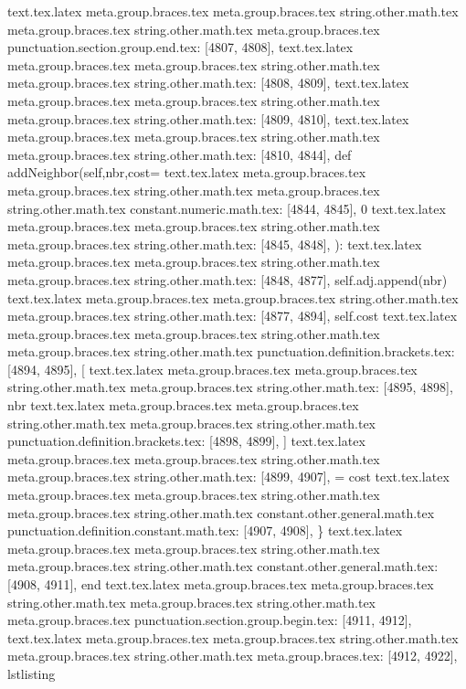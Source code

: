 {{{{{{{{{{{{{{{{{{{{{{{{{{{{{{{{{{{{{{{{{{{{{{{{{{{{{{{{{{{{{{{{{{{{{{{{{{{{{{{{{{{{{{{{{{{{{{{{{{{{{{{{{{{{{{{{{{{{{{{{{{{{{{{{{{{{{{{{{{{{{{{{{text.tex.latex meta.group.braces.tex meta.group.braces.tex string.other.math.tex meta.group.braces.tex string.other.math.tex meta.group.braces.tex punctuation.section.group.end.tex: [4807, 4808], {}}
text.tex.latex meta.group.braces.tex meta.group.braces.tex string.other.math.tex meta.group.braces.tex string.other.math.tex: [4808, 4809], {
}
text.tex.latex meta.group.braces.tex meta.group.braces.tex string.other.math.tex meta.group.braces.tex string.other.math.tex: [4809, 4810], {
}
text.tex.latex meta.group.braces.tex meta.group.braces.tex string.other.math.tex meta.group.braces.tex string.other.math.tex: [4810, 4844], {    def addNeighbor(self,nbr,cost=}
text.tex.latex meta.group.braces.tex meta.group.braces.tex string.other.math.tex meta.group.braces.tex string.other.math.tex constant.numeric.math.tex: [4844, 4845], {0}
text.tex.latex meta.group.braces.tex meta.group.braces.tex string.other.math.tex meta.group.braces.tex string.other.math.tex: [4845, 4848], {):
}
text.tex.latex meta.group.braces.tex meta.group.braces.tex string.other.math.tex meta.group.braces.tex string.other.math.tex: [4848, 4877], {        self.adj.append(nbr)
}
text.tex.latex meta.group.braces.tex meta.group.braces.tex string.other.math.tex meta.group.braces.tex string.other.math.tex: [4877, 4894], {        self.cost}
text.tex.latex meta.group.braces.tex meta.group.braces.tex string.other.math.tex meta.group.braces.tex string.other.math.tex punctuation.definition.brackets.tex: [4894, 4895], {[}
text.tex.latex meta.group.braces.tex meta.group.braces.tex string.other.math.tex meta.group.braces.tex string.other.math.tex: [4895, 4898], {nbr}
text.tex.latex meta.group.braces.tex meta.group.braces.tex string.other.math.tex meta.group.braces.tex string.other.math.tex punctuation.definition.brackets.tex: [4898, 4899], {]}
text.tex.latex meta.group.braces.tex meta.group.braces.tex string.other.math.tex meta.group.braces.tex string.other.math.tex: [4899, 4907], { = cost
}
text.tex.latex meta.group.braces.tex meta.group.braces.tex string.other.math.tex meta.group.braces.tex string.other.math.tex constant.other.general.math.tex punctuation.definition.constant.math.tex: [4907, 4908], {\}
text.tex.latex meta.group.braces.tex meta.group.braces.tex string.other.math.tex meta.group.braces.tex string.other.math.tex constant.other.general.math.tex: [4908, 4911], {end}
text.tex.latex meta.group.braces.tex meta.group.braces.tex string.other.math.tex meta.group.braces.tex string.other.math.tex meta.group.braces.tex punctuation.section.group.begin.tex: [4911, 4912], {{}
text.tex.latex meta.group.braces.tex meta.group.braces.tex string.other.math.tex meta.group.braces.tex string.other.math.tex meta.group.braces.tex: [4912, 4922], {lstlisting}
}}}}}}}}}}}}}}}}}}}}}}}}}}}}}}}}}}}}}}}}}}}}}}}}}}}}}}}}}}}}}}}}}}}}}}}}}}}}}}}}}}}}}}}}}}}}}}}}}}}}}}}}}}}}}}}}}}}}}}}}}}}}}}}}}}}}}}}}}}}}}}}}}}
